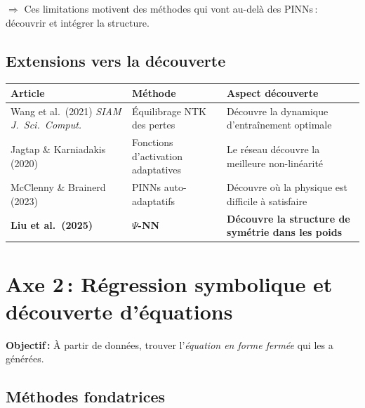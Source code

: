 \documentclass[11pt,a4paper]{article}
\begin{document}
$\Rightarrow$ Ces limitations motivent des méthodes qui vont au-delà des PINNs\,: découvrir et intégrer la structure.

\subsection{Extensions vers la découverte}

\begin{center}
\renewcommand{\arraystretch}{1.25}
\begin{tabular}{@{}p{4cm} p{3.5cm} p{5.5cm}@{}}
\toprule
\textbf{Article} & \textbf{Méthode} & \textbf{Aspect découverte} \\
\midrule
Wang et al.\ (2021) \textit{SIAM J.\ Sci.\ Comput.} & Équilibrage NTK des pertes & Découvre la dynamique d'entraînement optimale \\
Jagtap \& Karniadakis (2020) & Fonctions d'activation adaptatives & Le réseau découvre la meilleure non-linéarité \\
McClenny \& Brainerd (2023) & PINNs auto-adaptatifs & Découvre où la physique est difficile à satisfaire \\
\textbf{Liu et al.\ (2025)} & \textbf{$\Psi$-NN} & \textbf{Découvre la structure de symétrie dans les poids} \\
\bottomrule
\end{tabular}
\end{center}

\section{Axe 2\,: Régression symbolique et découverte d'équations}

\textbf{Objectif\,:} À partir de données, trouver l'\emph{équation en forme fermée} qui les a générées.

\subsection{Méthodes fondatrices}
\end{document}
